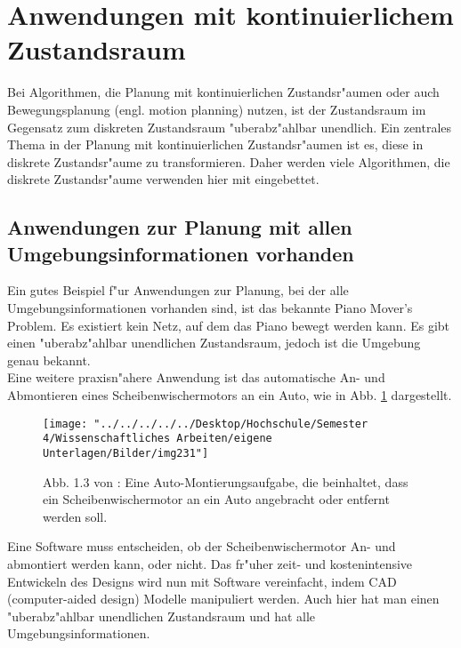 \section{Anwendungen mit kontinuierlichem Zustandsraum}
Bei Algorithmen, die Planung mit kontinuierlichen Zustandsr"aumen oder auch Bewegungsplanung (engl. motion planning) nutzen, ist der Zustandsraum im Gegensatz zum diskreten Zustandsraum "uberabz"ahlbar unendlich. Ein zentrales Thema in der Planung mit kontinuierlichen Zustandsr"aumen ist es, diese in diskrete Zustandsr"aume zu transformieren. Daher werden viele Algorithmen, die diskrete Zustandsr"aume verwenden hier mit eingebettet. 
\subsection{Anwendungen zur Planung mit allen Umgebungsinformationen vorhanden}
Ein gutes Beispiel f"ur Anwendungen zur Planung, bei der alle Umgebungsinformationen vorhanden sind, ist das bekannte Piano Mover's Problem. Es existiert kein Netz, auf dem das Piano bewegt werden kann. Es gibt einen "uberabz"ahlbar unendlichen Zustandsraum, jedoch ist die Umgebung genau bekannt.\\
Eine weitere praxisn"ahere Anwendung ist das automatische An- und Abmontieren eines Scheibenwischermotors an ein Auto, wie in Abb. \ref{Abb. 5.2} dargestellt.
\begin{figure}
	\centering
	\texttt{[image: "../../../../../Desktop/Hochschule/Semester 4/Wissenschaftliches Arbeiten/eigene Unterlagen/Bilder/img231"]}
	\caption{Abb. 1.3 von \cite[~S. 7]{Lav06}: Eine Auto-Montierungsaufgabe, die beinhaltet, dass ein Scheibenwischermotor an ein Auto angebracht oder entfernt werden soll.}
	\label{Abb. 5.2}
\end{figure}
Eine Software muss entscheiden, ob der Scheibenwischermotor An- und abmontiert werden kann, oder nicht. Das fr"uher zeit- und kostenintensive Entwickeln des Designs wird nun mit Software vereinfacht, indem CAD (computer-aided design) Modelle manipuliert werden. Auch hier hat man einen "uberabz"ahlbar unendlichen Zustandsraum und hat alle Umgebungsinformationen.
